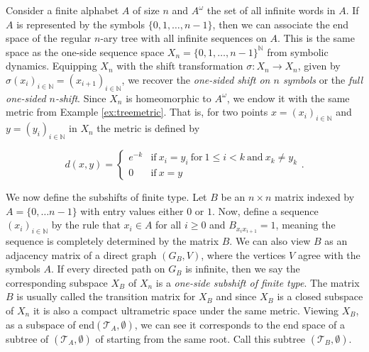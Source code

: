 \documentclass[12pt]{amsart}
\numberwithin{equation}{subsection}
\theoremstyle{definition}
\theoremstyle{definition}
\theoremstyle{remark}
\begin{document}
Consider a finite alphabet $A$ of size $n$ and $A^\omega$ the set of all infinite words in $A$. If $A$ is represented by the symbols $\{0, 1, \dots, n-1 \}$, then we can associate the end space of the regular $n$-ary tree with all infinite sequences on $A$. This is the same space as the one-side sequence space $X_n=\{0, 1, \dots, n-1 \}^{\mathbb N}$ from symbolic dynamics. Equipping $X_n$ with the shift transformation $\sigma:X_n \rightarrow X_n$, given by $\sigma(x_i)_{i \in \mathbb N} = (x_{i+1})_{i \in \mathbb N}$, we recover the \textit{one-sided shift on $n$ symbols} or the \textit{full one-sided $n$-shift}. Since $X_n$ is homeomorphic to $A^\omega$, we endow it with the same metric from Example \ref{ex:treemetric}. That is, for two points $x= (x_i)_{i \in \mathbb N}$ and $y= (y_i)_{i \in \mathbb N}$ in $X_n$ the metric is defined by 

\[ d(x,y) = \begin{cases}
    e^{-k} & \text{if} \: x_i =y_i \: \text{for} \: 1 \leq i <k \:  \text{and} \: x_k \neq y_k \\
    0 & \text{if} \: x =y
\end{cases}.\]




We now define the subshifts of finite type. Let $B$ be an $n \times n$ matrix indexed by $A=\{ 0, \dots n-1\}$ with entry values either $0$ or $1$. Now, define a sequence $(x_i)_{i\in \mathbb N}$ by the rule that $x_i \in A$ for all $i \geq 0$ and $B_{x_ix_{i+1}}=1$, meaning the sequence is completely determined by the matrix $B$. We can also view $B$ as an adjacency matrix of a direct graph $(G_B,V)$, where the vertices $V$ agree with the symbols $A$. If every directed path on $G_B$ is infinite, then we say the corresponding subspace $X_B$ of $X_n$ is a \textit{one-side subshift of finite type}. The matrix $B$ is usually called the transition matrix for $X_B$ and since $X_B$ is a closed subspace of $X_n$ it is also a compact ultrametric space under the same metric. Viewing $X_B$, as a subspace of $\text{end}(\mathcal T_A,\emptyset)$, we can see it corresponds to the end space of a subtree of $(\mathcal T_A, \emptyset)$ of starting from the same root. Call this subtree $(\mathcal T_B, \emptyset)$. 
\end{document}
